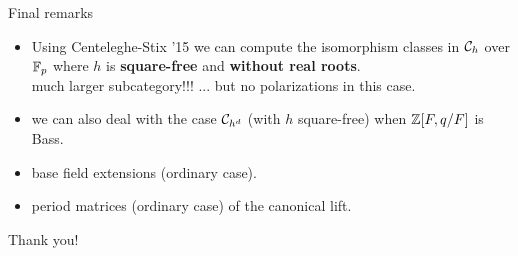 \documentclass[handout]{beamer}
\begin{document}
\begin{frame}{ Final remarks }
\begin{itemize}
         \item Using Centeleghe-Stix '15 we can compute the isomorphism classes in ${\mathcal C}_h$ over $\mathbb{F}_p$  where $h$ is \textbf{square-free} and \textbf{without real roots}.\\
\pause much larger subcategory!!! ... but no polarizations in this case.         
\pause   \item we can also deal with the case ${\mathcal C}_{h^d}$ (with $h$ square-free) when $\mathbb{Z}[F,q/F]$ is Bass.
\pause   \item base field extensions (ordinary case).
\pause   \item period matrices (ordinary case) of the canonical lift.
\end{itemize}
\end{frame}

\begin{frame}{ }
\begin{center}
{\Large Thank you!}
\end{center}
\end{frame}
\end{document}
